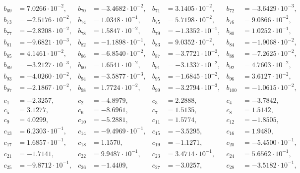 \begin{align*}
b_{ 69 } &= 7.0266 \cdot 10^{ -2 }, & b_{ 70 } &= -3.4682 \cdot 10^{ -2 }, & b_{ 71 } &= 3.1405 \cdot 10^{ -2 }, & b_{ 72 } &= -3.6429 \cdot 10^{ -3 },\\ 
b_{ 73 } &= -2.5176 \cdot 10^{ -2 }, & b_{ 74 } &= 1.0348 \cdot 10^{ -1 }, & b_{ 75 } &= 5.7198 \cdot 10^{ -2 }, & b_{ 76 } &= 9.0866 \cdot 10^{ -2 },\\ 
b_{ 77 } &= -2.8208 \cdot 10^{ -2 }, & b_{ 78 } &= 1.5847 \cdot 10^{ -2 }, & b_{ 79 } &= -1.3352 \cdot 10^{ -1 }, & b_{ 80 } &= 1.0252 \cdot 10^{ -1 },\\ 
b_{ 81 } &= -9.6821 \cdot 10^{ -3 }, & b_{ 82 } &= -1.1898 \cdot 10^{ -1 }, & b_{ 83 } &= 9.0352 \cdot 10^{ -2 }, & b_{ 84 } &= -1.9068 \cdot 10^{ -2 },\\ 
b_{ 85 } &= 4.1461 \cdot 10^{ -2 }, & b_{ 86 } &= -6.8540 \cdot 10^{ -2 }, & b_{ 87 } &= -3.7721 \cdot 10^{ -2 }, & b_{ 88 } &= -7.2625 \cdot 10^{ -2 },\\ 
b_{ 89 } &= -3.2127 \cdot 10^{ -3 }, & b_{ 90 } &= 1.6541 \cdot 10^{ -2 }, & b_{ 91 } &= -3.1337 \cdot 10^{ -2 }, & b_{ 92 } &= 4.7603 \cdot 10^{ -2 },\\ 
b_{ 93 } &= -4.0260 \cdot 10^{ -2 }, & b_{ 94 } &= -3.5877 \cdot 10^{ -3 }, & b_{ 95 } &= -1.6845 \cdot 10^{ -2 }, & b_{ 96 } &= 3.6127 \cdot 10^{ -2 },\\ 
b_{ 97 } &= -2.1867 \cdot 10^{ -2 }, & b_{ 98 } &= 1.7724 \cdot 10^{ -2 }, & b_{ 99 } &= -3.2794 \cdot 10^{ -3 }, & b_{ 100 } &= -1.0615 \cdot 10^{ -2 },\\ 
&&&&&&& \\ 
c_{ 1 } &= -2.3257, & c_{ 2 } &= -4.8979, & c_{ 3 } &= 2.2888, & c_{ 4 } &= -3.7842,\\ 
c_{ 5 } &= 3.1277, & c_{ 6 } &= -8.6961, & c_{ 7 } &= 1.5135, & c_{ 8 } &= 1.5142,\\ 
c_{ 9 } &= 4.0299, & c_{ 10 } &= -5.2881, & c_{ 11 } &= 1.5774, & c_{ 12 } &= -1.8505,\\ 
c_{ 13 } &= 6.2303 \cdot 10^{ -1 }, & c_{ 14 } &= -9.4969 \cdot 10^{ -1 }, & c_{ 15 } &= -3.5295, & c_{ 16 } &= 1.9480,\\ 
c_{ 17 } &= 1.6857 \cdot 10^{ -1 }, & c_{ 18 } &= 1.1570, & c_{ 19 } &= -1.1271, & c_{ 20 } &= -5.4500 \cdot 10^{ -1 },\\ 
c_{ 21 } &= -1.7141, & c_{ 22 } &= 9.9487 \cdot 10^{ -1 }, & c_{ 23 } &= 3.4714 \cdot 10^{ -1 }, & c_{ 24 } &= 5.6562 \cdot 10^{ -1 },\\ 
c_{ 25 } &= -9.8712 \cdot 10^{ -1 }, & c_{ 26 } &= -1.4409, & c_{ 27 } &= -3.0257, & c_{ 28 } &= -3.5182 \cdot 10^{ -1 },\\ 

\end{align*}
